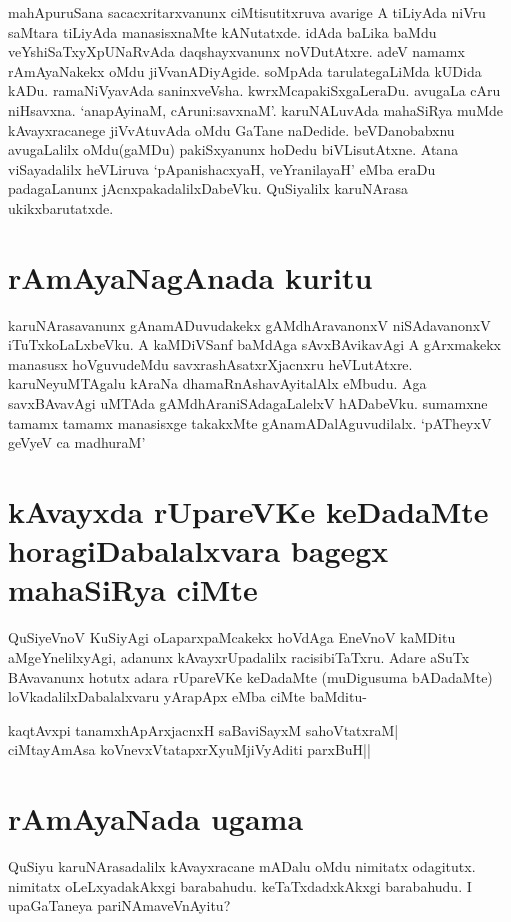 mahApuruSana sacacxritarxvanunx ciMtisutitxruva avarige A tiLiyAda niVru saMtara tiLiyAda manasisxnaMte kANutatxde. idAda baLika baMdu veYshiSaTxyXpUNaRvAda daqshayxvanunx noVDutAtxre. adeV namamx rAmAyaNakekx oMdu jiVvanADiyAgide. soMpAda tarulategaLiMda kUDida kADu. ramaNiVyavAda saninxveVsha. kwrxMcapakiSxgaLeraDu. avugaLa cAru niHsavxna. `anapAyinaM, cAruni:savxnaM'. karuNALuvAda mahaSiRya muMde kAvayxracanege jiVvAtuvAda oMdu GaTane naDedide. beVDanobabxnu avugaLalilx oMdu(gaMDu) pakiSxyanunx hoDedu biVLisutAtxne. Atana viSayadalilx heVLiruva `pApanishacxyaH, veYranilayaH' eMba eraDu padagaLanunx jAcnxpakadalilxDabeVku. QuSiyalilx karuNArasa ukikxbarutatxde. 

\section*{rAmAyaNagAnada kuritu}

karuNArasavanunx gAnamADuvudakekx gAMdhAravanonxV niSAdavanonxV iTuTxkoLaLxbeVku. A kaMDiVSanf baMdAga sAvxBAvikavAgi A gArxmakekx manasusx hoVguvudeMdu savxrashAsatxrXjacnxru heVLutAtxre. karuNeyuMTAgalu kAraNa dhamaRnAshavAyitalAlx eMbudu. Aga savxBAvavAgi uMTAda gAMdhAraniSAdagaLalelxV hADabeVku. sumamxne tamamx tamamx manasisxge takakxMte gAnamADalAguvudilalx. `pATheyxV geVyeV ca madhuraM'\label{164a} 

\section*{kAvayxda rUpareVKe keDadaMte horagiDabalalxvara bagegx mahaSiRya ciMte} 

QuSiyeVnoV KuSiyAgi oLaparxpaMcakekx hoVdAga EneVnoV kaMDitu aMgeYnelilxyAgi, adanunx kAvayxrUpadalilx racisibiTaTxru. Adare aSuTx BAvavanunx hotutx adara rUpareVKe keDadaMte (muDigusuma bADadaMte) loVkadalilxDabalalxvaru yArapApx eMba ciMte baMditu- 

\begin{shloka} 
kaqtAvxpi tanamxhApArxjacnxH saBaviSayxM sahoVtatxraM|\label{165}\\ 
ciMtayAmAsa koVnevxVtatapxrXyuMjiVyAditi parxBuH||
\end{shloka} 

\section*{rAmAyaNada ugama} 

QuSiyu karuNArasadalilx kAvayxracane mADalu oMdu nimitatx odagitutx. nimitatx oLeLxyadakAkxgi barabahudu. keTaTxdadxkAkxgi barabahudu. I upaGaTaneya pariNAmaveVnAyitu? 

